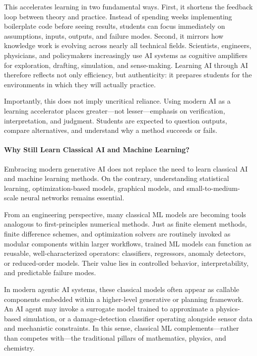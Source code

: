 \documentclass[12pt]{article}
\begin{document}
This accelerates learning in two fundamental ways. First, it shortens the feedback loop between theory and practice. Instead of spending weeks implementing boilerplate code before seeing results, students can focus immediately on assumptions, inputs, outputs, and failure modes. Second, it mirrors how knowledge work is evolving across nearly all technical fields. Scientists, engineers, physicians, and policymakers increasingly use AI systems as cognitive amplifiers for exploration, drafting, simulation, and sense-making. Learning AI through AI therefore reflects not only efficiency, but authenticity: it prepares students for the environments in which they will actually practice.

Importantly, this does not imply uncritical reliance. Using modern AI as a learning accelerator places greater—not lesser—emphasis on verification, interpretation, and judgment. Students are expected to question outputs, compare alternatives, and understand why a method succeeds or fails.

\paragraph{Why Still Learn Classical AI and Machine Learning?}
Embracing modern generative AI does not replace the need to learn classical AI and machine learning methods. On the contrary, understanding statistical learning, optimization-based models, graphical models, and small-to-medium-scale neural networks remains essential.

From an engineering perspective, many classical ML models are becoming tools analogous to first-principles numerical methods. Just as finite element methods, finite difference schemes, and optimization solvers are routinely invoked as modular components within larger workflows, trained ML models can function as reusable, well-characterized operators: classifiers, regressors, anomaly detectors, or reduced-order models. Their value lies in controlled behavior, interpretability, and predictable failure modes.

In modern agentic AI systems, these classical models often appear as callable components embedded within a higher-level generative or planning framework. An AI agent may invoke a surrogate model trained to approximate a physics-based simulation, or a damage-detection classifier operating alongside sensor data and mechanistic constraints. In this sense, classical ML complements—rather than competes with—the traditional pillars of mathematics, physics, and chemistry.
\end{document}
